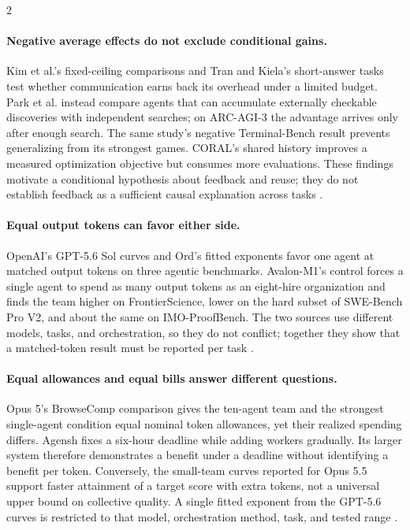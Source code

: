 \begin{multicols}{2}
\paragraph{Negative average effects do not exclude conditional gains.}
Kim et al.'s fixed-ceiling comparisons and Tran and Kiela's short-answer tasks test whether communication earns back its overhead under a limited budget. Park et al. instead compare agents that can accumulate externally checkable discoveries with independent searches; on ARC-AGI-3 the advantage arrives only after enough search. The same study's negative Terminal-Bench result prevents generalizing from its strongest games. CORAL's shared history improves a measured optimization objective but consumes more evaluations. These findings motivate a conditional hypothesis about feedback and reuse; they do not establish feedback as a sufficient causal explanation across tasks \citep{kim-scaling-agent-systems,tran-kiela-equal-budget,test-time-communication,coral}.

\paragraph{Equal output tokens can favor either side.}
OpenAI's GPT-5.6 Sol curves and Ord's fitted exponents favor one agent at matched output tokens on three agentic benchmarks. Avalon-M1's control forces a single agent to spend as many output tokens as an eight-hire organization and finds the team higher on FrontierScience, lower on the hard subset of SWE-Bench Pro V2, and about the same on IMO-ProofBench. The two sources use different models, tasks, and orchestration, so they do not conflict; together they show that a matched-token result must be reported per task \citep{openai-gpt56-ultra,ord-swarm-scaling,avalon-m1}.

\paragraph{Equal allowances and equal bills answer different questions.}
Opus 5's BrowseComp comparison gives the ten-agent team and the strongest single-agent condition equal nominal token allowances, yet their realized spending differs. Agensh fixes a six-hour deadline while adding workers gradually. Its larger system therefore demonstrates a benefit under a deadline without identifying a benefit per token. Conversely, the small-team curves reported for Opus 5.5 support faster attainment of a target score with extra tokens, not a universal upper bound on collective quality. A single fitted exponent from the GPT-5.6 curves is restricted to that model, orchestration method, task, and tested range \citep{opus5-card-multiagent,agensh-1024,opus55-card,ord-swarm-scaling}.


\end{multicols}
